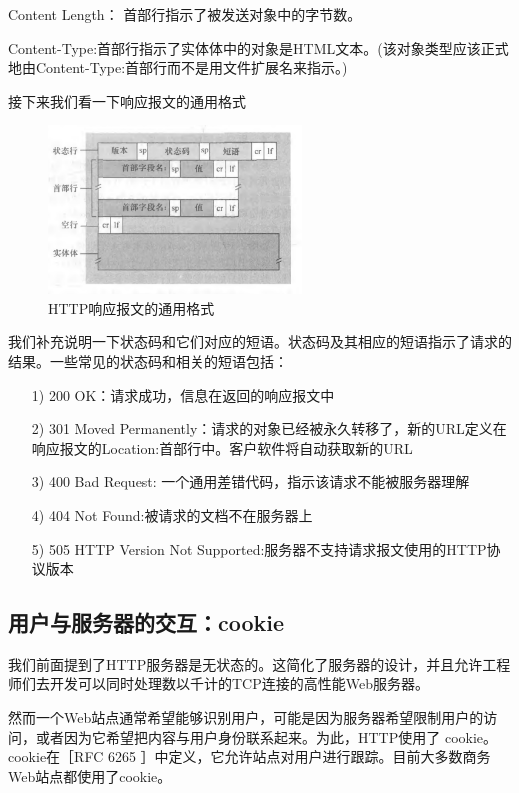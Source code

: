     Content Length： 首部行指示了被发送对象中的字节数。
    
    Content-Type:首部行指示了实体体中的对象是HTML文本。(该对象类型应该正式地由Content-Type:首部行而不是用文件扩展名来指示。)

    接下来我们看一下响应报文的通用格式

\begin{figure}[!htbp]
    \centering
    \includegraphics[width=0.6\textwidth]{image/chapter02/响应报文通用格式.png}
    \caption{HTTP响应报文的通用格式}
\end{figure}

    我们补充说明一下状态码和它们对应的短语。状态码及其相应的短语指示了请求的结果。一些常见的状态码和相关的短语包括：

\begin{itemize}
    \item [1)] 200 OK：请求成功，信息在返回的响应报文中
    \item [2)] 301 Moved Permanently：请求的对象已经被永久转移了，新的URL定义在响应报文的Location:首部行中。客户软件将自动获取新的URL
    \item [3)] 400 Bad Request: 一个通用差错代码，指示该请求不能被服务器理解
    \item [4)] 404 Not Found:被请求的文档不在服务器上
    \item [5)] 505 HTTP Version Not Supported:服务器不支持请求报文使用的HTTP协议版本
\end{itemize}

\subsection{用户与服务器的交互：cookie}

    我们前面提到了HTTP服务器是无状态的。这简化了服务器的设计，并且允许工程师们去开发可以同时处理数以千计的TCP连接的高性能Web服务器。

    然而一个Web站点通常希望能够识别用户，可能是因为服务器希望限制用户的访问，或者因为它希望把内容与用户身份联系起来。为此，HTTP使用了 cookie。cookie在［RFC 6265 ］中定义，它允许站点对用户进行跟踪。目前大多数商务Web站点都使用了cookie。

